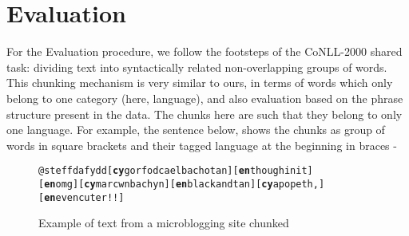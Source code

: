 \documentclass[11pt]{article}
\begin{document}


%
%


\section{Evaluation}
\label{sec:eval}

For the Evaluation procedure, we follow the footsteps of the CoNLL-2000 shared task: dividing text into syntactically related non-overlapping groups of words. This chunking mechanism \cite{tjong2003introduction} is very similar to ours, in terms of words which only belong to one category (here, language), and also evaluation based on the phrase structure present in the data. The chunks here are such that they belong to only one language. For example, the sentence below, shows the chunks as group of words in square brackets and their tagged language at the beginning in braces - \\

\begin{figure}
\begin{small}
\begin{alltt}
@steffdafydd [\textbf{cy} gorfod cael bach o tan] [\textbf{en} though init]
[\textbf{en} omg] [\textbf{cy} mar cwn bach yn] [\textbf{en} black and tan] [\textbf{cy} a popeth,] [\textbf{en} even cuter!!]
\end{alltt}
\end{small}
\label{fig:tweets}
\caption{Example of text from a microblogging site chunked}
\end{figure}
\end{document}
